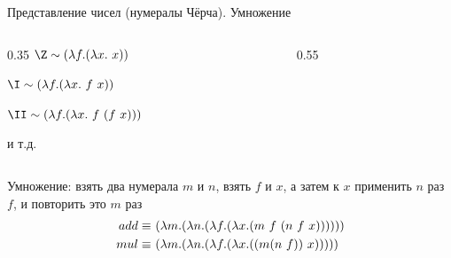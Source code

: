 \begin{frame}{Представление чисел (нумералы Чёрча). Умножение}
\begin{columns}[T]
    \begin{column}{0.35\textwidth}
$ \Z \sim \lam{f}{\lam{x}{\ x}}$

$ \I \sim \lam{f}{\lam{x}{\ f\ x}}$

$ \II \sim \lam{f}{\lam{x}{\ f\ (f\ x)}}$

  и т.д.
    \end{column}
    \begin{column}{0.55\textwidth}
    \end{column}
\end{columns}

  \vspace{1cm}


Умножение: взять два нумерала $m$ и $n$, взять $f$ и $x$, а затем к $x$ применить $n$ раз $f$, и повторить это $m$ раз
\vspace{-0.5em}
{\Large \begin{align*}
add \equiv &\ (\lambda m . (\lambda n . (\lambda f . (\lambda x . (m\ f\  (n\ f\  x))))))\\
mul \equiv &\ (\lambda m . (\lambda n . (\lambda f . (\lambda x . ((m (n\ f )){\ x} )))))\\
\end{align*}}
\end{frame}




